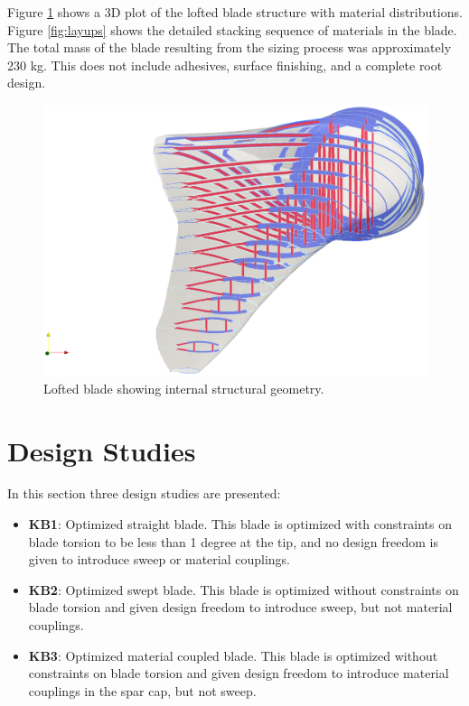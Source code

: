 Figure \ref{fig:loftedstructure_baseline} shows a 3D plot of the lofted blade structure with material distributions.
Figure \ref{fig:layups} shows the detailed stacking sequence of materials in the blade.
The total mass of the blade resulting from the sizing process was approximately 230 kg.
This does not include adhesives, surface finishing, and a complete root design.

\begin{figure}[!ht]
\begin{center}
	\includegraphics[width=1\linewidth]{figures/loftedbladestructure_basic_sizing.eps}
\end{center}
\caption{Lofted blade showing internal structural geometry.}
\label{fig:loftedstructure_baseline}
\end{figure}

\clearpage

\section{Design Studies}

In this section three design studies are presented:

\begin{itemize}
	\item \textbf{KB1}: Optimized straight blade. This blade is optimized with constraints on blade torsion to be less than 1 degree at the tip, and no design freedom is given to introduce sweep or material couplings.
	\item \textbf{KB2}: Optimized swept blade. This blade is optimized without constraints on blade torsion and given design freedom to introduce sweep, but not material couplings.
	\item \textbf{KB3}: Optimized material coupled blade. This blade is optimized without constraints on blade torsion and given design freedom to introduce material couplings in the spar cap, but not sweep.
\end{itemize}

